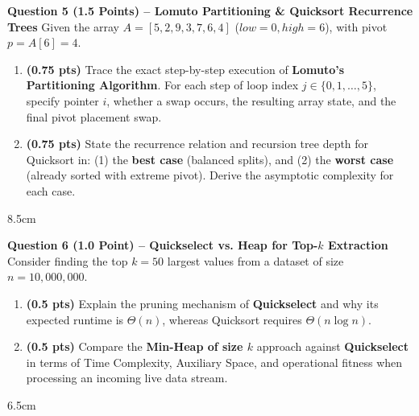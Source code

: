 \documentclass[11pt,a4paper]{article}
\begin{document}
\newpage


\textbf{Question 5 (1.5 Points) -- Lomuto Partitioning \& Quicksort Recurrence Trees}
Given the array $A = [5, 2, 9, 3, 7, 6, 4]$ ($low = 0, high = 6$), with pivot $p = A[6] = 4$.
\begin{enumerate}[label=(\alph*)]
    \item \textbf{(0.75 pts)} Trace the exact step-by-step execution of \textbf{Lomuto's Partitioning Algorithm}. For each step of loop index $j \in \{0, 1, \dots, 5\}$, specify pointer $i$, whether a swap occurs, the resulting array state, and the final pivot placement swap.
    \item \textbf{(0.75 pts)} State the recurrence relation and recursion tree depth for Quicksort in: (1) the \textbf{best case} (balanced splits), and (2) the \textbf{worst case} (already sorted with extreme pivot). Derive the asymptotic complexity for each case.
\end{enumerate}

\begin{answerbox}{8.5cm}
\end{answerbox}

\vspace{0.3em}

\textbf{Question 6 (1.0 Point) -- Quickselect vs. Heap for Top-$k$ Extraction}
Consider finding the top $k = 50$ largest values from a dataset of size $n = 10,000,000$.
\begin{enumerate}[label=(\alph*)]
    \item \textbf{(0.5 pts)} Explain the pruning mechanism of \textbf{Quickselect} and why its expected runtime is $\Theta(n)$, whereas Quicksort requires $\Theta(n \log n)$.
    \item \textbf{(0.5 pts)} Compare the \textbf{Min-Heap of size $k$} approach against \textbf{Quickselect} in terms of Time Complexity, Auxiliary Space, and operational fitness when processing an incoming live data stream.
\end{enumerate}

\begin{answerbox}{6.5cm}
\end{answerbox}

\newpage
\end{document}
